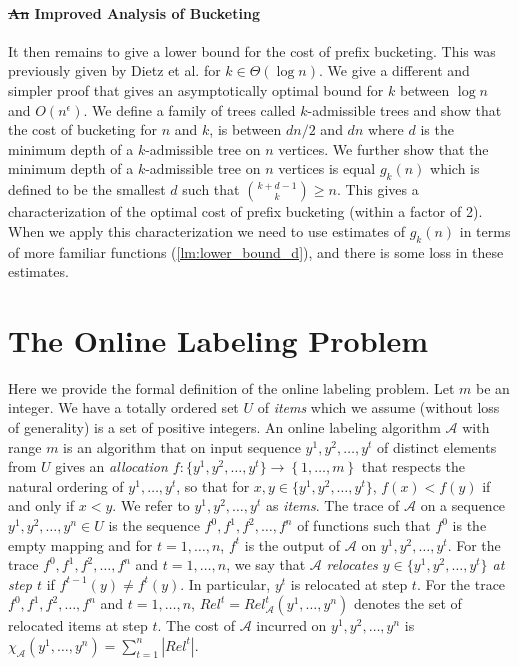 \documentclass[unicode,review]{siamart1116}
\newcommand{\A}{\mathcal{A}}
\newcommand{\natInt}[2]{ \left\{ #1, \dotsc, #2 \right\} }
\numberwithin{theorem}{section}
\providecommand{\DIFdel}[1]{{\protect\color{red}\sout{#1}}}                      %
\providecommand{\DIFdelbegin}{} %
\providecommand{\DIFdelend}{} %
\newcommand{\DIFscaledelfig}{0.5}
\newlength{\DIFdelgraphicswidth} %
\newlength{\DIFdelgraphicsheight} %
\newcommand{\DIFdelincludegraphics}[2][]{%
\sbox{\DIFdelgraphicsbox}{\DIFOincludegraphics[#1]{#2}}%
\settoboxwidth{\DIFdelgraphicswidth}{\DIFdelgraphicsbox} %
\settoboxtotalheight{\DIFdelgraphicsheight}{\DIFdelgraphicsbox} %
\scalebox{\DIFscaledelfig}{%
\parbox[b]{\DIFdelgraphicswidth}{\usebox{\DIFdelgraphicsbox}\\[-\baselineskip] \rule{\DIFdelgraphicswidth}{0em}}\llap{\resizebox{\DIFdelgraphicswidth}{\DIFdelgraphicsheight}{%
\setlength{\unitlength}{\DIFdelgraphicswidth}%
\begin{picture}(1,1)%
\thicklines\linethickness{2pt} %
{\color[rgb]{1,0,0}\put(0,0){\framebox(1,1){}}}%
{\color[rgb]{1,0,0}\put(0,0){\line( 1,1){1}}}%
{\color[rgb]{1,0,0}\put(0,1){\line(1,-1){1}}}%
\end{picture}%
}\hspace*{3pt}}} %
} %
\DeclareRobustCommand{\DIFdelbegin}{\DIFOdelbegin \let\includegraphics\DIFdelincludegraphics} %
\DeclareRobustCommand{\DIFdelend}{\DIFOaddend \let\includegraphics\DIFOincludegraphics} %
\begin{document}
\paragraph{\DIFdelbegin \DIFdel{An }\DIFdelend Improved Analysis of Bucketing}

It then remains to give a lower bound
for the cost of prefix bucketing.  This was previously given by Dietz et al. \cite{DSZ04} for $k\in \Theta(\log n)$.
We give a different and simpler proof that gives an asymptotically optimal bound for $k$ between $\log n$ and $O(n^\epsilon)$.
We define a family of trees called $k$-admissible trees and show that the cost
of bucketing  for $n$ and $k$, is between $dn/2$ and $dn$ where $d$ is the minimum depth of a $k$-admissible tree
on $n$ vertices.  We further show that the minimum depth of a $k$-admissible tree on $n$ vertices
is equal $g_k(n)$ which is defined to be the smallest $d$ such that $\binom{k+d-1}{k} \geq n$.
This gives a  characterization of the optimal cost of prefix bucketing (within a factor of 2).  When we apply
this characterization we need to use estimates of $g_k(n)$ in terms of more familiar functions (\cref{lm:lower_bound_d}),
and there is some loss in these estimates.

\section{The Online Labeling Problem}\label{s-olp}

Here we provide the formal definition of the online labeling problem.
Let $m$ be an integer. We have a totally ordered set $U$ of {\em items} which we assume (without loss of generality) is
a set of positive integers. 
An online labeling algorithm $\A$ with range $m$ is an algorithm that on input sequence $y^1,y^2,\dotsc,y^t$ of distinct elements
from $U$ gives
an \emph{allocation $f : \{y^1,y^2,\dotsc,y^t\} \rightarrow \natInt{1}{m}$} that respects the natural ordering of $y^1,\dotsc,y^t$, so that
for $x,y\in \{y^1,y^2,\dotsc,y^t\}$, $f(x) < f(y)$ if and only if $x < y$. We refer to $y^1,y^2,\dotsc,y^t$
as \emph{items}. The trace of $\A$ on a sequence $y^1,y^2,\dotsc,y^n\in U$ is the sequence $f^0,f^1,f^2,\dotsc,f^n$ of functions
such that $f^0$ is the empty mapping and for $t=1,\dotsc,n$, $f^t$ is the output of $\A$ on $y^1,y^2,\dotsc,y^t$.
For the trace $f^0,f^1,f^2,\dotsc,f^n$ and $t=1,\dotsc,n$, we say that $\A$ \emph{relocates $y\in \{y^1,y^2,\dotsc,y^t\}$ at step $t$}
if $f^{t-1}(y)\not=f^t(y)$. In particular, $y^t$ is relocated at step $t$.
For the trace $f^0,f^1,f^2,\dotsc,f^n$ and $t=1,\dotsc,n$, $Rel^t=Rel^t_\A(y^1,\ldots,y^n)$  denotes the set of relocated items at step $t$.
The cost of $\A$ incurred on $y^1,y^2,\dotsc,y^n$ is $\chi_\A(y^1,\dotsc,y^n)=\sum_{t=1}^n |Rel^t|$. 
\end{document}
